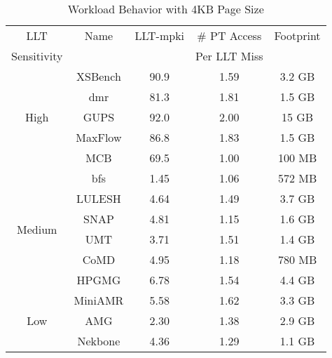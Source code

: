 \begin {table}[b]
\small
\begin{center} 
\vspace{-0.0 in}
\caption{Workload Behavior with 4KB Page Size}
\vspace{-0. in}
\begin{tabular}{| c | c | c | c | c | }
\hline
  LLT                   & Name     &  LLT-mpki  & \# PT Access    &  Footprint  \\ 
  Sensitivity           &          &    & Per LLT Miss   &             \\ \hline
\multirow{5}{*}{High}   & XSBench  & 90.9       & 1.59         &  3.2 GB  \\
                        & dmr      & 81.3       & 1.81         &  1.5 GB  \\
                        & GUPS     & 92.0       & 2.00         &  15  GB  \\
                        & MaxFlow  & 86.8       & 1.83         &  1.5 GB  \\
                        & MCB      & 69.5       & 1.00         &  100 MB  \\ \hline
\multirow{6}{*}{Medium} & bfs      & 1.45       & 1.06         &  572 MB  \\
                        & LULESH   & 4.64       & 1.49         &  3.7  GB \\
                        & SNAP     & 4.81       & 1.15         &  1.6 GB  \\
                        & UMT      & 3.71       & 1.51         &  1.4 GB  \\
                        & CoMD     & 4.95       & 1.18         &  780 MB  \\
                        & HPGMG    & 6.78       & 1.54         &  4.4 GB  \\ \hline 
\multirow{3}{*}{Low}    & MiniAMR  & 5.58       & 1.62         &  3.3 GB  \\
                        & AMG      & 2.30       & 1.38         &  2.9 GB  \\ 
                        & Nekbone  & 4.36       & 1.29         &  1.1 GB  \\ \hline


\end{tabular}
\label{table:bench_char}
\vspace{-0.2in}
\end{center}
\normalsize
\end{table}

